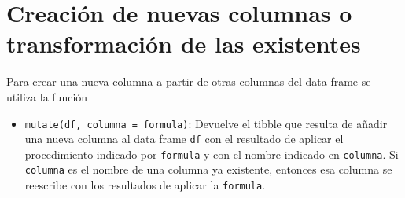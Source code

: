 \documentclass[
  a4paper,
]{scrreport}
\providecommand{\tightlist}{%
  \setlength{\itemsep}{0pt}\setlength{\parskip}{0pt}}\usepackage{longtable,booktabs,array}
\theoremstyle{definition}
\theoremstyle{definition}
\theoremstyle{remark}
\begin{document}
\section{Creación de nuevas columnas o transformación de las
existentes}\label{creaciuxf3n-de-nuevas-columnas-o-transformaciuxf3n-de-las-existentes}

Para crear una nueva columna a partir de otras columnas del data frame
se utiliza la función

\begin{itemize}
\tightlist
\item
  \texttt{mutate(df,\ columna\ =\ formula)}: Devuelve el tibble que
  resulta de añadir una nueva columna al data frame \texttt{df} con el
  resultado de aplicar el procedimiento indicado por \texttt{formula} y
  con el nombre indicado en \texttt{columna}. Si \texttt{columna} es el
  nombre de una columna ya existente, entonces esa columna se reescribe
  con los resultados de aplicar la \texttt{formula}.
\end{itemize}
\end{document}
